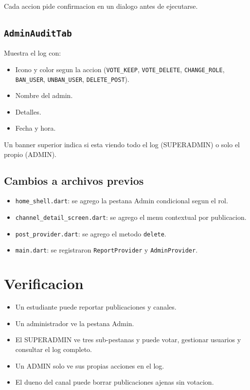 Cada accion pide confirmacion en un dialogo antes de ejecutarse.

\subsection{\texttt{AdminAuditTab}}

Muestra el log con:

\begin{itemize}[leftmargin=*]
  \item Icono y color segun la accion (\texttt{VOTE\_KEEP}, \texttt{VOTE\_DELETE}, \texttt{CHANGE\_ROLE}, \texttt{BAN\_USER}, \texttt{UNBAN\_USER}, \texttt{DELETE\_POST}).
  \item Nombre del admin.
  \item Detalles.
  \item Fecha y hora.
\end{itemize}

Un banner superior indica si esta viendo todo el log (SUPERADMIN) o solo el propio (ADMIN).

\subsection{Cambios a archivos previos}

\begin{itemize}[leftmargin=*]
  \item \texttt{home\_shell.dart}: se agrego la pestana Admin condicional segun el rol.
  \item \texttt{channel\_detail\_screen.dart}: se agrego el menu contextual por publicacion.
  \item \texttt{post\_provider.dart}: se agrego el metodo \texttt{delete}.
  \item \texttt{main.dart}: se registraron \texttt{ReportProvider} y \texttt{AdminProvider}.
\end{itemize}

\section{Verificacion}

\begin{itemize}[leftmargin=*]
  \item Un estudiante puede reportar publicaciones y canales.
  \item Un administrador ve la pestana Admin.
  \item El SUPERADMIN ve tres sub-pestanas y puede votar, gestionar usuarios y consultar el log completo.
  \item Un ADMIN solo ve sus propias acciones en el log.
  \item El dueno del canal puede borrar publicaciones ajenas sin votacion.
\end{itemize}

